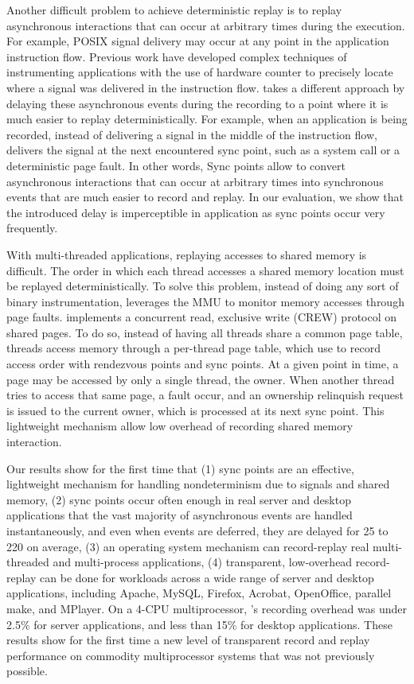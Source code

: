 Another difficult problem to achieve deterministic replay is to replay
asynchronous interactions that can occur at arbitrary times during the
execution. For example, POSIX signal delivery may occur at any point in the
application instruction flow. Previous work have developed complex techniques
of instrumenting applications with the use of hardware counter to precisely
locate where a signal was delivered in the instruction flow.
\scribe takes a different approach by delaying these asynchronous events
during the recording to a point where it is much easier to replay
deterministically. For example, when an application is being recorded,
instead of delivering a signal in the middle of the instruction flow, \scribe
delivers the signal at the next encountered sync point, such as a system call or
a deterministic page fault. In other words,
Sync points allow \scribe to convert asynchronous interactions that can occur at
arbitrary times into synchronous events that are much easier to record and
replay. In our evaluation, we show that the introduced delay is imperceptible
in application as sync points occur very frequently.

With multi-threaded applications, replaying accesses to shared memory is
difficult. The order in which each thread accesses a shared memory location must
be replayed deterministically. To solve this problem, instead of doing any sort
of binary instrumentation, \scribe leverages the MMU to monitor memory accesses
through page faults. \scribe implements a concurrent read, exclusive write
(CREW) protocol on shared pages. To do so, instead of having all threads share a
common page table, threads access memory through a per-thread page table, which
\scribe use to record access order with rendezvous points and sync points.
At a given point in time, a page may be accessed by only a single thread, the
owner. When another thread tries to access that same page, a fault occur,
and an ownership relinquish request is issued to the current owner, which is
processed at its next sync point. This lightweight mechanism allow low
overhead of recording shared memory interaction.

Our results show for the first time that (1) sync points are an effective,
lightweight mechanism for handling nondeterminism due to signals and shared
memory, (2) sync points occur often enough in real server and desktop
applications that the vast majority of asynchronous events are handled
instantaneously, and even when events are deferred, they are delayed for 25 to
220\us{} on average, (3) an operating system mechanism can record-replay real
multi-threaded and multi-process applications, (4) transparent, low-overhead
record-replay can be done for workloads across a wide range of server and
desktop applications, including Apache, MySQL, Firefox, Acrobat, OpenOffice,
parallel make, and MPlayer.  On a 4-CPU multiprocessor, \scribe{}'s recording
overhead was under 2.5\% for server applications, and less than 15\% for desktop
applications.  These results show for the first time a new level of transparent
record and replay performance on commodity multiprocessor systems that was not
previously possible. 

